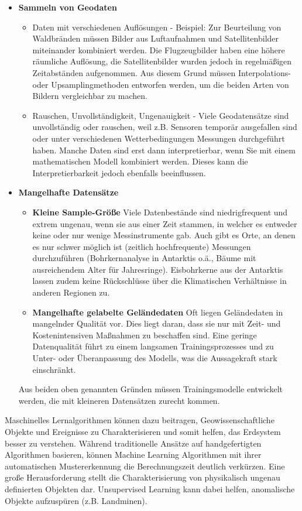 \documentclass[11pt,fleqn]{book}
\begin{document}
\begin{itemize}
\item \textbf{Sammeln von Geodaten}
\begin{itemize}
\item Daten mit verschiedenen Auflösungen - Beispiel: Zur Beurteilung von Waldbränden müssen Bilder aus Luftaufnahmen und Satellitenbilder miteinander kombiniert werden. Die Flugzeugbilder haben eine höhere räumliche Auflösung, die Satellitenbilder wurden jedoch in regelmäßigen Zeitabständen aufgenommen. Aus diesem Grund müssen Interpolations- oder Upsamplingmethoden entworfen werden, um die beiden Arten von Bildern vergleichbar zu machen.
\item Rauschen, Unvollständigkeit, Ungenauigkeit - Viele Geodatensätze sind unvollständig oder rauschen, weil z.B. Sensoren temporär ausgefallen sind oder unter verschiedenen Wetterbedingungen Messungen durchgeführt haben. Manche Daten sind erst dann interpretierbar, wenn Sie mit einem mathematischen Modell kombiniert werden. Dieses kann die Interpretierbarkeit jedoch ebenfalls beeinflussen.
\end{itemize}

\item \textbf{Mangelhafte Datensätze}
\begin{itemize}
\item \textbf{Kleine Sample-Größe} Viele Datenbestände sind niedrigfrequent und extrem ungenau, wenn sie aus einer Zeit stammen, in welcher es entweder keine oder nur wenige Messinstrumente gab. Auch gibt es Orte, an denen es nur schwer möglich ist (zeitlich hochfrequente) Messungen durchzuführen (Bohrkernanalyse in Antarktis o.ä., Bäume mit ausreichendem Alter für Jahresringe). Eisbohrkerne aus der Antarktis lassen zudem keine Rückschlüsse über die Klimatischen Verhältnisse in anderen Regionen zu. 
\item  \textbf{Mangelhafte gelabelte Geländedaten} Oft liegen Geländedaten in mangelnder Qualität vor. Dies liegt daran, dass sie nur mit Zeit- und Kostenintensiven Maßnahmen zu beschaffen sind. Eine geringe Datenqualität führt zu einem langsamen Trainingsprozesses und zu Unter- oder Überanpassung des Modells, was die Aussagekraft stark einschränkt.
\end{itemize}
Aus beiden oben genannten Gründen müssen Trainingsmodelle entwickelt werden, die mit kleineren Datensätzen zurecht kommen.
\end{itemize}
\bigskip
Maschinelles Lernalgorithmen können dazu beitragen, Geowissenschaftliche Objekte und Ereignisse zu Charakterisieren und somit helfen, das Erdsystem besser zu verstehen. Während traditionelle Ansätze auf handgefertigten Algorithmen basieren, können Machine Learning Algorithmen mit ihrer automatischen Mustererkennung die Berechnungszeit deutlich verkürzen. Eine große Herausforderung stellt die Charakterisierung von physikalisch ungenau definierten Objekten dar. Unsupervised Learning kann dabei helfen, anomalische Objekte aufzuspüren (z.B. Landminen).\\
\end{document}
